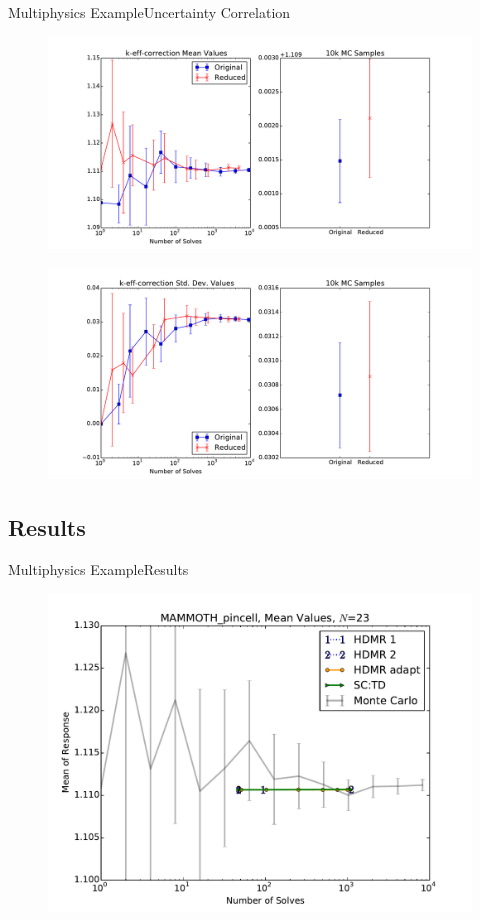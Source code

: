 \documentclass{beamer}
\begin{document}
\begin{frame}{Multiphysics Example}{Uncertainty Correlation}\vspace{-20pt}
      \begin{figure}
        \centering
        \includegraphics[width=0.6\linewidth]{mammoth/pincell_k-eff-correction_mean_reduction}
      \end{figure}
      \vspace{-30pt}
      \begin{figure}
        \centering
        \includegraphics[width=0.6\linewidth]{mammoth/pincell_k-eff-correction_stddev_reduction}
      \end{figure}
\end{frame}


\subsection{Results}
\begin{frame}{Multiphysics Example}{Results}%
      \begin{figure}
        \centering
        \includegraphics[width=0.8\linewidth]{mammoth/MAMMOTH_pincell_mean_vals}
      \end{figure}
\end{frame}
\end{document}
